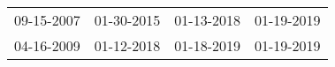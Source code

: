 \begin{supertabular}{llll}
 09-15-2007 &  01-30-2015 &  01-13-2018 &  01-19-2019 \\
 04-16-2009 &  01-12-2018 &  01-18-2019 &  01-19-2019 \\
\end{supertabular}
